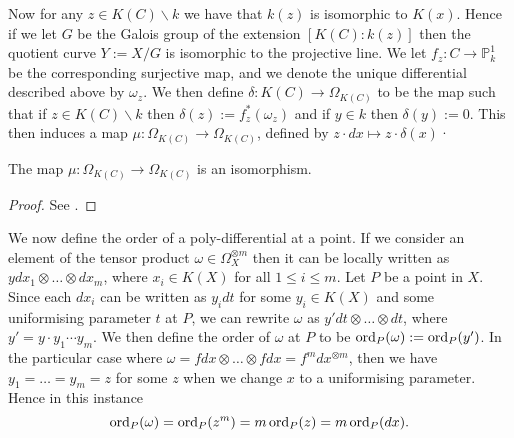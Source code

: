Now for any $z\in K(C) \backslash k$ we have that $k(z)$ is isomorphic to $K(x)$.
Hence if we let $G$ be the Galois group of the extension $[K(C):k(z)]$ then the quotient curve $Y:=X/G$ is isomorphic to the projective line.
We let $f_z\colon C \rightarrow \mathbb P_k^1$ be the corresponding surjective map, and we denote the unique differential described above by $\omega_z$.
We then define $\delta\colon K(C) \rightarrow \Omega_{K(C)}$ to be the map such that if $z\in K(C)\backslash k$ then $\delta (z) := f_z^*(\omega_z)$ and if $y\in k$ then $\delta(y):=0$.
This then induces a map $\mu\colon \Omega_{K(C)} \rightarrow \Omega_{K(C)}$, defined by $z\cdot dx \mapsto z\cdot \delta(x)$·

    \begin{thm}
    The map $\mu\colon \Omega_{K(C)} \rightarrow \Omega_{K(C)}$ is an isomorphism.
    \end{thm}
    \begin{proof}
    See \cite[Thm. 4.3.2]{stichtenoth}.
    \end{proof}

We now define the order of a poly-differential at a point.
If we consider an element of the tensor product $\omega \in \Omega_X^{\otimes m}$ then it can be locally written as $y dx_1\otimes \ldots \otimes dx_m$, where $x_i \in K(X)$ for all $1 \leq i \leq m$.
Let $P$ be a point in $X$.
Since each $dx_i$ can be written as $y_i dt$ for some $y_i\in K(X)$ and some uniformising parameter $t$ at $P$, we can rewrite $\omega$ as $y' dt \otimes \ldots \otimes dt$, where $y' = y \cdot y_1 \cdots y_m$.
We then define the order of $\omega$ at $P$ to be $\operatorname{ord}_P(\omega ) := \operatorname{ord}_P(y')$.
In the particular case where $\omega = fdx \otimes \ldots \otimes fdx = f^m dx^{\otimes m}$, then we have $y_1 = \ldots = y_m = z$ for some $z$ when we change $x$ to a uniformising parameter.
Hence in this instance 
    \[ 
    \operatorname{ord}_P(\omega) = \operatorname{ord}_P(z^m) = m\operatorname{ord}_P(z) = m\operatorname{ord}_P(dx).
    \]
